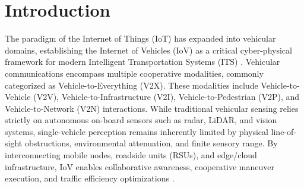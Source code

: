 \section{Introduction}
\label{sec:introduction}

The paradigm of the Internet of Things (IoT) has expanded into vehicular domains, establishing the Internet of Vehicles (IoV) as a critical cyber-physical framework for modern Intelligent Transportation Systems (ITS) \cite{szalay2023survey}.
Vehicular communications encompass multiple cooperative modalities, commonly categorized as Vehicle-to-Everything (V2X).
These modalities include Vehicle-to-Vehicle (V2V), Vehicle-to-Infrastructure (V2I), Vehicle-to-Pedestrian (V2P), and Vehicle-to-Network (V2N) interactions.
While traditional vehicular sensing relies strictly on autonomous on-board sensors such as radar, LiDAR, and vision systems, single-vehicle perception remains inherently limited by physical line-of-sight obstructions, environmental attenuation, and finite sensory range.
By interconnecting mobile nodes, roadside units (RSUs), and edge/cloud infrastructure, IoV enables collaborative awareness, cooperative maneuver execution, and traffic efficiency optimizations \cite{gyawali2020challenges}.

